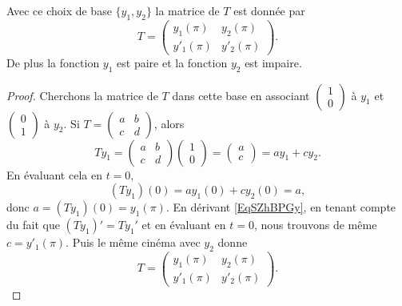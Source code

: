 \begin{lemma}   \label{IVLzNaU}
	Avec ce choix de base \( \{ y_1,y_2 \}\) la matrice de \( T\) est donnée par
	\begin{equation}
		T=\begin{pmatrix}
			y_1(\pi)  & y_2(\pi)  \\
			y'_1(\pi) & y'_2(\pi)
		\end{pmatrix}.
	\end{equation}
	De plus la fonction \( y_1\) est paire et la fonction \( y_2\) est impaire.
\end{lemma}

\begin{proof}

	Cherchons la matrice de \( T\) dans cette base en associant \( \begin{pmatrix}
		1 \\
		0
	\end{pmatrix}\) à \( y_1\) et \( \begin{pmatrix}
		0 \\
		1
	\end{pmatrix}\) à \( y_2\). Si \( T=\begin{pmatrix}
		a & b \\
		c & d
	\end{pmatrix}\), alors
	\begin{equation}    \label{EqSZhBPGy}
		Ty_1=\begin{pmatrix}
			a & b \\
			c & d
		\end{pmatrix}\begin{pmatrix}
			1 \\
			0
		\end{pmatrix}=\begin{pmatrix}
			a \\
			c
		\end{pmatrix}=ay_1+cy_2.
	\end{equation}
	En évaluant cela en \( t=0\),
	\begin{equation}
		(Ty_1)(0)=ay_1(0)+cy_2(0)=a,
	\end{equation}
	donc \(a=(Ty_1)(0)=y_1(\pi)\). En dérivant \eqref{EqSZhBPGy}, en tenant compte du fait que \( (Ty_1)'=Ty_1'\) et en évaluant en \( t=0\), nous trouvons de même \( c=y'_1(\pi)\). Puis le même cinéma avec \( y_2\) donne
	\begin{equation}
		T=\begin{pmatrix}
			y_1(\pi)  & y_2(\pi)  \\
			y'_1(\pi) & y'_2(\pi)
		\end{pmatrix}.
	\end{equation}


\end{proof}

